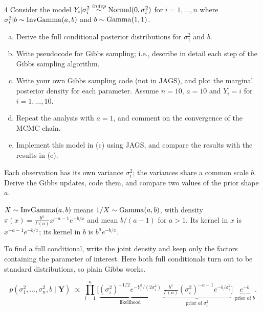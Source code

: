 \documentclass[11pt]{article}
\begin{document}

\begin{problem}{4}
Consider the model $Y_i|\sigma_i^2\overset{indep}{\sim}\mathrm{Normal}(0,\sigma_i^2)$ for $i=1,\dots,n$ where $\sigma_i^2|b\sim\mathrm{InvGamma}(a,b)$ and $b\sim\mathrm{Gamma}(1,1)$.
\begin{enumerate}[(a)]
\item Derive the full conditional posterior distributions for $\sigma_1^2$ and $b$.
\item Write pseudocode for Gibbs sampling; i.e., describe in detail each step of the Gibbs sampling algorithm.
\item Write your own Gibbs sampling code (not in JAGS), and plot the marginal posterior density for each parameter. Assume $n=10$, $a=10$ and $Y_i=i$ for $i=1,\dots,10$.
\item Repeat the analysis with $a=1$, and comment on the convergence of the MCMC chain.
\item Implement this model in (c) using JAGS, and compare the results with the results in (c).
\end{enumerate}
\end{problem}

\begin{restate}
Each observation has its own variance $\sigma_i^2$; the variances share a common scale $b$. Derive the Gibbs updates, code them, and compare two values of the prior shape $a$.
\end{restate}

\begin{recall}
$X\sim\mathrm{InvGamma}(a,b)$ means $1/X\sim\mathrm{Gamma}(a,b)$, with density $\pi(x)=\frac{b^a}{\Gamma(a)}x^{-a-1}e^{-b/x}$ and mean $b/(a-1)$ for $a>1$. Its kernel in $x$ is $x^{-a-1}e^{-b/x}$; its kernel in $b$ is $b^ae^{-b/x}$.
\end{recall}

\begin{keyidea}
To find a full conditional, write the joint density and keep only the factors containing the parameter of interest. Here both full conditionals turn out to be standard distributions, so plain Gibbs works.
\end{keyidea}

\solution
{}
\[
p(\sigma_1^2,\dots,\sigma_n^2,b\mid\mathbf Y)\ \propto\ \prod_{i=1}^n\Big[\underbrace{(\sigma_i^2)^{-1/2}e^{-Y_i^2/(2\sigma_i^2)}}_{\text{likelihood}}\ \underbrace{\tfrac{b^a}{\Gamma(a)}(\sigma_i^2)^{-a-1}e^{-b/\sigma_i^2}}_{\text{prior of }\sigma_i^2}\Big]\ \underbrace{e^{-b}}_{\text{prior of }b}.
\]
\end{document}
